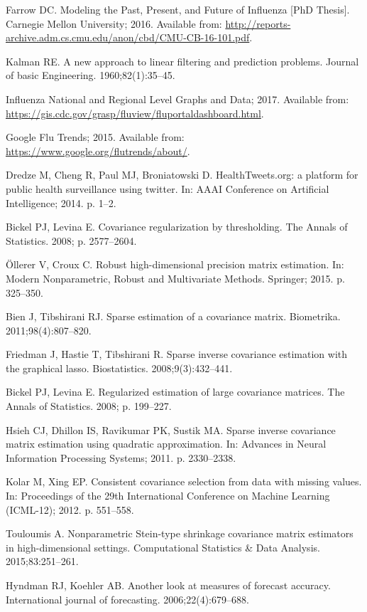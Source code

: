 \documentclass[10pt,letterpaper]{article}
\begin{document}
\begin{thebibliography}{10}
Farrow DC.
\newblock Modeling the Past, Present, and Future of Influenza [PhD Thesis].
\newblock Carnegie Mellon University; 2016.
\newblock Available from:
  \url{http://reports-archive.adm.cs.cmu.edu/anon/cbd/CMU-CB-16-101.pdf}.

Kalman RE.
\newblock A new approach to linear filtering and prediction problems.
\newblock Journal of basic Engineering. 1960;82(1):35--45.

Influenza National and Regional Level Graphs and Data; 2017.
\newblock Available from:
  \url{https://gis.cdc.gov/grasp/fluview/fluportaldashboard.html}.

Google Flu Trends; 2015.
\newblock Available from: \url{https://www.google.org/flutrends/about/}.

Dredze M, Cheng R, Paul MJ, Broniatowski D.
\newblock HealthTweets.org: a platform for public health surveillance using
  twitter.
\newblock In: AAAI Conference on Artificial Intelligence; 2014. p. 1--2.

Bickel PJ, Levina E.
\newblock Covariance regularization by thresholding.
\newblock The Annals of Statistics. 2008; p. 2577--2604.

{\"O}llerer V, Croux C.
\newblock Robust high-dimensional precision matrix estimation.
\newblock In: Modern Nonparametric, Robust and Multivariate Methods. Springer;
  2015. p. 325--350.

Bien J, Tibshirani RJ.
\newblock Sparse estimation of a covariance matrix.
\newblock Biometrika. 2011;98(4):807--820.

Friedman J, Hastie T, Tibshirani R.
\newblock Sparse inverse covariance estimation with the graphical lasso.
\newblock Biostatistics. 2008;9(3):432--441.

Bickel PJ, Levina E.
\newblock Regularized estimation of large covariance matrices.
\newblock The Annals of Statistics. 2008; p. 199--227.

Hsieh CJ, Dhillon IS, Ravikumar PK, Sustik MA.
\newblock Sparse inverse covariance matrix estimation using quadratic
  approximation.
\newblock In: Advances in Neural Information Processing Systems; 2011. p.
  2330--2338.

Kolar M, Xing EP.
\newblock Consistent covariance selection from data with missing values.
\newblock In: Proceedings of the 29th International Conference on Machine
  Learning (ICML-12); 2012. p. 551--558.

Touloumis A.
\newblock Nonparametric Stein-type shrinkage covariance matrix estimators in
  high-dimensional settings.
\newblock Computational Statistics \& Data Analysis. 2015;83:251--261.

Hyndman RJ, Koehler AB.
\newblock Another look at measures of forecast accuracy.
\newblock International journal of forecasting. 2006;22(4):679--688.

\end{thebibliography}
\end{document}
